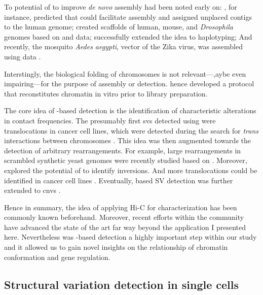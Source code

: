 To potential of \hic to improve \textit{de novo} assembly had been noted early on:
, for instance, predicted that \hic could facilitate assembly
and assigned unplaced contigs to the human genome;  created
scaffolds of human, mouse, and \textit{Drosophila} genomes based on \hic and
\mps data;  successfully extended the idea to haplotyping;
And recently, the mosquito \textit{Aedes aegypti}, vector of the Zika virus, was
assembled using \hic data \citep{Dudchenko2017}.

Interstingly, the biological folding of chromosomes is not relevant---,aybe even
impairing---for the purpose of assembly or \sv detection. \citet{Putnam2016}
hence developed a protocol that reconstitutes chromatin in vitro prior to \hic
library preparation.

The core idea of \hic-based \sv detection is the identification of characteristic
alterations in contact frequencies. The presumably first \acp{sv} detected using
\hic were translocations in cancer cell lines, which were detected during the
search for \textit{trans} interactions between chromosomes \citep{Rickman2012}.
This idea was then augmented towards the detection of arbitrary rearrangements.
For example, large rearrangements in scrambled synthetic yeast genomes were
recently studied based on \hic \citep{Mercy2017}. Moreover, \citet{Putnam2016}
explored the potential of \hic to identify inversions. And more translocations
could be identified in cancer cell lines \citep{Barutcu2015,Ay2015,Harewood2017}.
Eventually, \hic based SV detection was further extended to \acp{cnv}
\citep{Harewood2017,Li2018}.

Hence in summary, the idea of applying Hi-C for \sv characterization has been
commonly known beforehand. Moreover, recent efforts within the community
have advanced the state of the art far way beyond the application I presented
here.  Nevertheless was \hic-based \sv detection a highly important step within
our study and it allowed us to gain novel insights on the relationship of
chromatin conformation and gene regulation.




\subsection{Structural variation detection in single cells}

